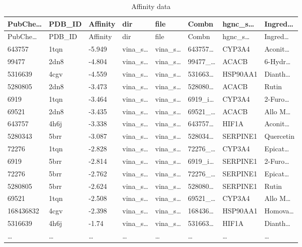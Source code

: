 \documentclass[
]{article}
\begin{document}
\begin{longtable}[]{@{}llllllll@{}}
\caption{\label{tab:Affinity-data}Affinity data}\tabularnewline
\toprule
PubChe\ldots{} & PDB\_ID & Affinity & dir & file & Combn & hgnc\_s\ldots{} & Ingred\ldots{}\tabularnewline
\midrule
\endfirsthead
\toprule
PubChe\ldots{} & PDB\_ID & Affinity & dir & file & Combn & hgnc\_s\ldots{} & Ingred\ldots{}\tabularnewline
\midrule
\endhead
643757 & 1tqn & -5.949 & vina\_s\ldots{} & vina\_s\ldots{} & 643757\ldots{} & CYP3A4 & Aconit\ldots{}\tabularnewline
99477 & 2dn8 & -4.804 & vina\_s\ldots{} & vina\_s\ldots{} & 99477\_\ldots{} & ACACB & 6-Hydr\ldots{}\tabularnewline
5316639 & 4cgv & -4.559 & vina\_s\ldots{} & vina\_s\ldots{} & 531663\ldots{} & HSP90AA1 & Dianth\ldots{}\tabularnewline
5280805 & 2dn8 & -3.473 & vina\_s\ldots{} & vina\_s\ldots{} & 528080\ldots{} & ACACB & Rutin\tabularnewline
6919 & 1tqn & -3.464 & vina\_s\ldots{} & vina\_s\ldots{} & 6919\_i\ldots{} & CYP3A4 & 2-Furo\ldots{}\tabularnewline
69521 & 2dn8 & -3.435 & vina\_s\ldots{} & vina\_s\ldots{} & 69521\_\ldots{} & ACACB & Allo M\ldots{}\tabularnewline
643757 & 4h6j & -3.338 & vina\_s\ldots{} & vina\_s\ldots{} & 643757\ldots{} & HIF1A & Aconit\ldots{}\tabularnewline
5280343 & 5brr & -3.087 & vina\_s\ldots{} & vina\_s\ldots{} & 528034\ldots{} & SERPINE1 & Quercetin\tabularnewline
72276 & 1tqn & -2.828 & vina\_s\ldots{} & vina\_s\ldots{} & 72276\_\ldots{} & CYP3A4 & Epicat\ldots{}\tabularnewline
6919 & 5brr & -2.814 & vina\_s\ldots{} & vina\_s\ldots{} & 6919\_i\ldots{} & SERPINE1 & 2-Furo\ldots{}\tabularnewline
72276 & 5brr & -2.762 & vina\_s\ldots{} & vina\_s\ldots{} & 72276\_\ldots{} & SERPINE1 & Epicat\ldots{}\tabularnewline
5280805 & 5brr & -2.624 & vina\_s\ldots{} & vina\_s\ldots{} & 528080\ldots{} & SERPINE1 & Rutin\tabularnewline
69521 & 1tqn & -2.508 & vina\_s\ldots{} & vina\_s\ldots{} & 69521\_\ldots{} & CYP3A4 & Allo M\ldots{}\tabularnewline
168436832 & 4cgv & -2.398 & vina\_s\ldots{} & vina\_s\ldots{} & 168436\ldots{} & HSP90AA1 & Homova\ldots{}\tabularnewline
5316639 & 4h6j & -1.74 & vina\_s\ldots{} & vina\_s\ldots{} & 531663\ldots{} & HIF1A & Dianth\ldots{}\tabularnewline
\ldots{} & \ldots{} & \ldots{} & \ldots{} & \ldots{} & \ldots{} & \ldots{} & \ldots{}\tabularnewline
\bottomrule
\end{longtable}

\begin{center}\vspace{1.5cm}\end{center}
\end{document}

